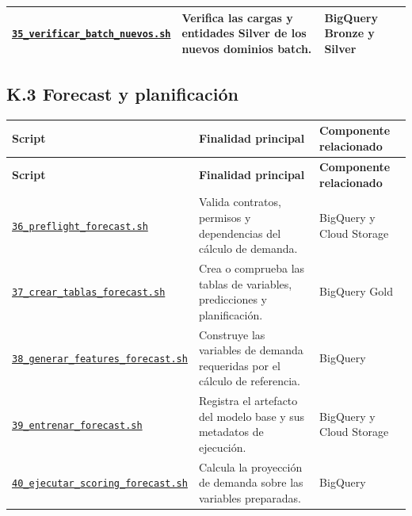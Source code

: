 \documentclass[11pt]{article}
\begin{document}
\begin{longtable}{@{}>{\raggedright\arraybackslash}p{}>{\raggedright\arraybackslash}p{}>{\raggedright\arraybackslash}p{}@{}}
\href{https://github.com/Codenid/lumina-retail-data-platform/blob/main/implementation/automatizacion/scripts35_verificar_batch_nuevos.sh}{\texttt{35\_\allowbreak{}verificar\_\allowbreak{}batch\_\allowbreak{}nuevos.sh}} & Verifica las cargas y entidades Silver de los nuevos dominios batch. & BigQuery Bronze y Silver \\
\bottomrule
\end{longtable}
\endgroup

\subsection*{K.3 Forecast y planificación}
\begingroup\scriptsize
\begin{longtable}{@{}>{\raggedright\arraybackslash}p{}>{\raggedright\arraybackslash}p{}>{\raggedright\arraybackslash}p{}@{}}
\toprule
\textbf{Script} & \textbf{Finalidad principal} & \textbf{Componente relacionado} \\
\midrule
\endfirsthead
\toprule
\textbf{Script} & \textbf{Finalidad principal} & \textbf{Componente relacionado} \\
\midrule
\endhead
\href{https://github.com/Codenid/lumina-retail-data-platform/blob/main/implementation/automatizacion/scripts36_preflight_forecast.sh}{\texttt{36\_\allowbreak{}preflight\_\allowbreak{}forecast.sh}} & Valida contratos, permisos y dependencias del cálculo de demanda. & BigQuery y Cloud Storage \\
\href{https://github.com/Codenid/lumina-retail-data-platform/blob/main/implementation/automatizacion/scripts37_crear_tablas_forecast.sh}{\texttt{37\_\allowbreak{}crear\_\allowbreak{}tablas\_\allowbreak{}forecast.sh}} & Crea o comprueba las tablas de variables, predicciones y planificación. & BigQuery Gold \\
\href{https://github.com/Codenid/lumina-retail-data-platform/blob/main/implementation/automatizacion/scripts38_generar_features_forecast.sh}{\texttt{38\_\allowbreak{}generar\_\allowbreak{}features\_\allowbreak{}forecast.sh}} & Construye las variables de demanda requeridas por el cálculo de referencia. & BigQuery \\
\href{https://github.com/Codenid/lumina-retail-data-platform/blob/main/implementation/automatizacion/scripts39_entrenar_forecast.sh}{\texttt{39\_\allowbreak{}entrenar\_\allowbreak{}forecast.sh}} & Registra el artefacto del modelo base y sus metadatos de ejecución. & BigQuery y Cloud Storage \\
\href{https://github.com/Codenid/lumina-retail-data-platform/blob/main/implementation/automatizacion/scripts40_ejecutar_scoring_forecast.sh}{\texttt{40\_\allowbreak{}ejecutar\_\allowbreak{}scoring\_\allowbreak{}forecast.sh}} & Calcula la proyección de demanda sobre las variables preparadas. & BigQuery \\

\end{longtable}
\end{document}
